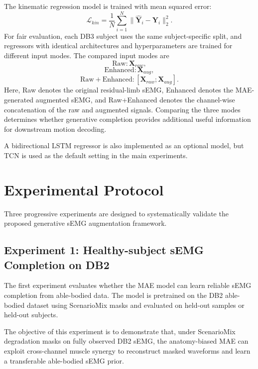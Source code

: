 \documentclass[journal]{IEEEtran}
\begin{document}
The kinematic regression model is trained with mean squared error:
\begin{equation}
\mathcal{L}_{kin} = \frac{1}{N} \sum_{i=1}^{N} \|\hat{\mathbf{Y}}_i-\mathbf{Y}_i\|_2^2.
\end{equation}
For fair evaluation, each DB3 subject uses the same subject-specific split, and regressors with identical architectures and hyperparameters are trained for different input modes. The compared input modes are
\begin{equation}
\mathrm{Raw}: \mathbf{X}_{raw},
\end{equation}
\begin{equation}
\mathrm{Enhanced}: \mathbf{X}_{aug},
\end{equation}
\begin{equation}
\mathrm{Raw+Enhanced}: [\mathbf{X}_{raw};\mathbf{X}_{aug}].
\end{equation}
Here, Raw denotes the original residual-limb sEMG, Enhanced denotes the MAE-generated augmented sEMG, and Raw+Enhanced denotes the channel-wise concatenation of the raw and augmented signals. Comparing the three modes determines whether generative completion provides additional useful information for downstream motion decoding.

A bidirectional LSTM regressor is also implemented as an optional model, but TCN is used as the default setting in the main experiments.

\section{Experimental Protocol}
Three progressive experiments are designed to systematically validate the proposed generative sEMG augmentation framework.

\subsection{Experiment 1: Healthy-subject sEMG Completion on DB2}
The first experiment evaluates whether the MAE model can learn reliable sEMG completion from able-bodied data. The model is pretrained on the DB2 able-bodied dataset using ScenarioMix masks and evaluated on held-out samples or held-out subjects.

The objective of this experiment is to demonstrate that, under ScenarioMix degradation masks on fully observed DB2 sEMG, the anatomy-biased MAE can exploit cross-channel muscle synergy to reconstruct masked waveforms and learn a transferable able-bodied sEMG prior.
\end{document}
